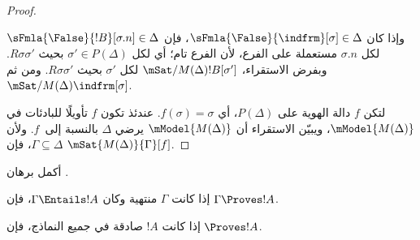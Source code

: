 \documentclass[../../../include/open-logic-section]{subfiles}
\begin{document}
\begin{proof}
\begin{enumerate}
{{      وإذا كان $\sFmla{\False}{\indfrm}[\sigma] \in \Delta$، فإن
      $\sFmla{\False}{!B}[\sigma.n] \in \Delta$ لكل $\sigma.n$
      مستعملة على الفرع، لأن الفرع تام؛ أي لكل $\sigma'
      \in P(\Delta)$ بحيث $R\sigma\sigma'$. وبفرض الاستقراء،
      $\mSat/{M(\Delta)}{!B}[\sigma']$ لكل $\sigma'$ بحيث
      $R\sigma\sigma'$. ومن ثم $\mSat/{M(\Delta)}{\indfrm}[\sigma]$.}}
\end{enumerate}
لتكن $f$ دالة الهوية على $P(\Delta)$، أي $f(\sigma)=\sigma$. عندئذ
تكون $f$ تأويلًا للبادئات في $\mModel{M(\Delta)}$، ويبيّن الاستقراء
أن $\mModel{M(\Delta)}$ يرضي $\Delta$ بالنسبة إلى~$f$. ولأن
$\Gamma \subseteq \Delta$، فإن $\mSat{M(\Delta)}{\Gamma}[f]$.
\end{proof}

\begin{prob}
أكمل برهان .
\end{prob}

\begin{cor}
إذا كانت $\Gamma$ منتهية وكان $\Gamma \Entails !A$، فإن
$\Gamma \Proves !A$.
\end{cor}

\begin{cor}
إذا كانت $!A$ صادقة في جميع النماذج، فإن $\Proves !A$.
\end{cor}
\end{document}
